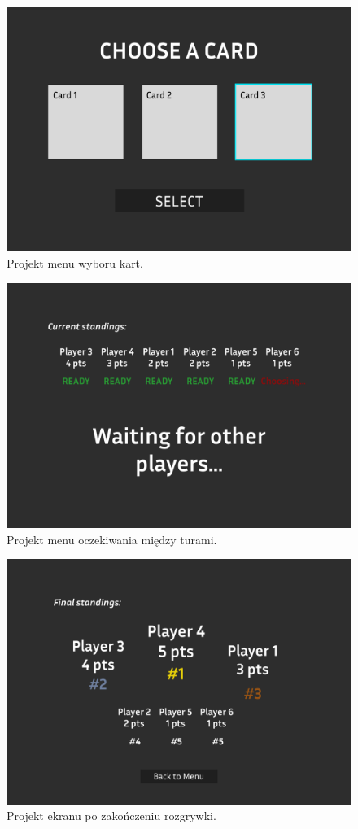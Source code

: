 \begin{figure}
    \centering
    \includegraphics[width=.8\linewidth]{Images/design/Cards Menu.png}
    \caption{Projekt menu wyboru kart.}
    \label{fig:cards_menu}
\end{figure}

\begin{figure}
    \centering
    \includegraphics[width=.8\linewidth]{Images/design/Waiting Menu.png}
    \caption{Projekt menu oczekiwania między turami.}
    \label{fig:waiting_menu}
\end{figure}

\begin{figure}
    \centering
    \includegraphics[width=.8\linewidth]{Images/design/Final Menu.png}
    \caption{Projekt ekranu po zakończeniu rozgrywki.}
    \label{fig:final_menu}
\end{figure}

